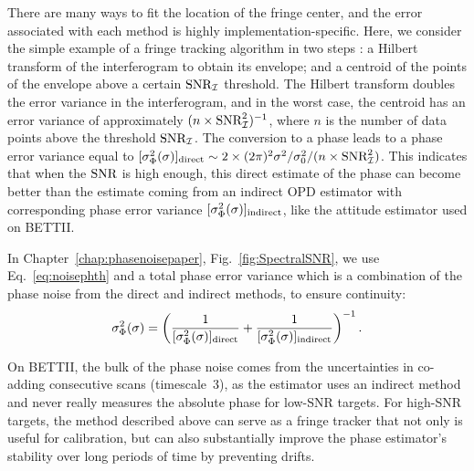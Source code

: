 There are many ways to fit the location of the fringe center, and the error associated with each method is highly implementation-specific. Here, we consider the simple example of a fringe tracking algorithm in two steps \citep{Rizzo:2012jp}: a Hilbert transform of the interferogram to obtain its envelope; and a centroid of the points of the envelope above a certain $\textrm{SNR}_{\mathcal{I}}$ threshold. The Hilbert transform doubles the error variance in the interferogram, and in the worst case, the centroid has an error variance of approximately $ (n\times\textrm{SNR}_{\mathcal{I}}^2)^{-1}$, where $n$ is the number of data points above the threshold $\textrm{SNR}_{\mathcal{I}}$. The conversion to a phase leads to a phase error variance equal to $[\sigma^2_\Phi(\sigma)]_\textrm{direct} \sim 2\times(2\pi)^2 {\sigma^2/\sigma_0^2}/ (n\times\textrm{SNR}_{\mathcal{I}}^2)$. This indicates that when the $\textrm{SNR}$ is high enough, this direct estimate of the phase can become better than the estimate coming from an indirect OPD estimator with corresponding phase error variance $[\sigma^2_\Phi(\sigma)]_\textrm{indirect}$, like the attitude estimator used on BETTII. 


In Chapter~\ref{chap:phasenoisepaper}, Fig.~\ref{fig:SpectralSNR}, we use Eq.~\ref{eq:noisephth} and a total phase error variance which is a combination of the phase noise from the direct and indirect methods, to ensure continuity:
\begin{equation}
\sigma^2_\Phi(\sigma) = \left( \frac{1}{[\sigma^2_\Phi(\sigma)]_\textrm{direct}} + \frac{1}{[\sigma^2_\Phi(\sigma)]_\textrm{indirect}}\right)^{-1}.
\end{equation}

On BETTII, the bulk of the phase noise comes from the uncertainties in co-adding consecutive scans (timescale~3), as the estimator uses an indirect method and never really measures the absolute phase for low-SNR targets. For high-SNR targets, the method described above can serve as a fringe tracker that not only is useful for calibration, but can also substantially improve the phase estimator's stability over long periods of time by preventing drifts.
